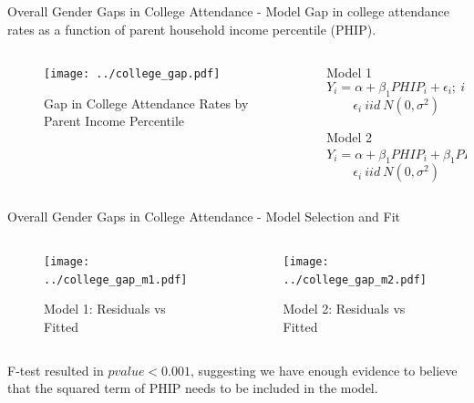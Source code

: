 \documentclass{beamer}
\begin{document}
\begin{frame}{Overall Gender Gaps in College Attendance - Model}
Gap in college attendance rates as a function of parent household income percentile (PHIP).\\

\begin{columns}
	
	\begin{column}{0.4\textwidth}
		\vspace{\topsep}
		\begin{figure}
			\vspace{-0.5cm}	
			\texttt{[image: ../college\_gap.pdf]}
			\caption{{\scriptsize Gap in College Attendance Rates by Parent Income Percentile}}
		\end{figure}	
	\end{column}
	
	\begin{column}{0.5\textwidth}
		\vspace{-1cm}
		\begin{block}{Model 1}
			$$Y_i = \alpha + \beta_1 PHIP_i  + \epsilon_i; \  i=1,\dots 100$$
			$$\epsilon_i \ iid \ N(0,\sigma^2)$$
		\end{block}
		\begin{block}{Model 2}
			$$Y_i = \alpha + \beta_1 PHIP_i + \beta_1 PHIP_i^2 +  \epsilon_i$$
			$$\epsilon_i \ iid \ N(0,\sigma^2)$$
		\end{block}
	\end{column}
\end{columns}
\end{frame}
	
\begin{frame}{Overall Gender Gaps in College Attendance - Model Selection and Fit}

\begin{columns}
	\begin{column}{0.4\textwidth}
	\vspace{\topsep}
	\begin{figure}
		\vspace{-0.5cm}	
		\texttt{[image: ../college\_gap\_m1.pdf]}
		\caption{{\scriptsize Model 1: Residuals vs Fitted}}
	\end{figure}	
\end{column}

\begin{column}{0.4\textwidth}
	\vspace{\topsep}
\begin{figure}
	\vspace{-0.5cm}	
	\texttt{[image: ../college\_gap\_m2.pdf]}
	\caption{{\scriptsize Model 2: Residuals vs Fitted}}
\end{figure}	
\end{column}
\end{columns}

F-test resulted in $pvalue<0.001$, suggesting we have enough evidence to believe that the squared term of PHIP needs to be included in the model.
\end{frame}
\end{document}
